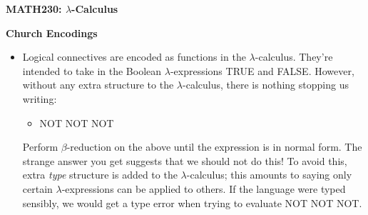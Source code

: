 \documentclass[11pt]{report}
\begin{document}
	
	
\begin{center}
	{\bf MATH230: $\lambda$-Calculus}
\end{center}
\begin{center}
	{\bf Church Encodings}
\end{center}


\noindent{}
\newline
\vspace{0.5cm}


\begin{itemize}


	\item Logical connectives are encoded as functions in the $\lambda$-calculus. They're intended to take in the Boolean $\lambda$-expressions TRUE and FALSE. However, without any extra structure to the $\lambda$-calculus, there is nothing stopping us writing:

	\vspace{0.2cm}
	\begin{itemize}
		\item[] NOT NOT NOT 
	\end{itemize}

	\vspace{0.2cm}

	Perform $\beta$-reduction on the above until the expression is in normal form. The strange answer you get suggests that we should not do this! To avoid this, extra \emph{type} structure is added to the $\lambda$-calculus; this amounts to saying only certain $\lambda$-expressions can be applied to others. If the language were typed sensibly, we would get a type error when trying to evaluate NOT NOT NOT.
	
\end{itemize}	
\end{document}
